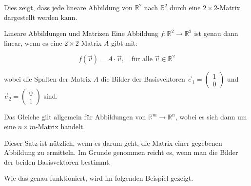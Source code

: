 Dies zeigt, dass jede lineare Abbildung von \( \mathbb{R}^2 \) nach \( \mathbb{R}^2 \) durch eine \( 2 \times 2 \)-Matrix dargestellt werden kann.
\clearpage
\begin{satz}
{Lineare Abbildungen und Matrizen}{}
Eine Abbildung \( f: \mathbb{R}^2 \to \mathbb{R}^2 \) ist genau dann linear, wenn es eine \( 2 \times 2 \)-Matrix \( A \) gibt mit:

\[
f(\vec{v}) = A \cdot \vec{v}, \quad \text{für alle } \vec{v} \in \mathbb{R}^2
\]

wobei die Spalten der Matrix \( A \) die Bilder der Basisvektoren \( \vec{e}_1 = \begin{pmatrix} 1 \\ 0 \end{pmatrix} \) und \( \vec{e}_2 = \begin{pmatrix} 0 \\ 1 \end{pmatrix} \) sind.


Das Gleiche gilt allgemein für Abbildungen von \( \mathbb{R}^m \to \mathbb{R}^n \), wobei es sich dann um eine \( n \times m \)-Matrix handelt.



\end{satz}

Dieser Satz ist nützlich, wenn es darum geht, die Matrix einer gegebenen Abbildung zu ermitteln. Im Grunde genommen reicht es, wenn man die Bilder der beiden Basisvektoren bestimmt. 

Wie das genau funktioniert, wird im folgenden Beispiel gezeigt.


